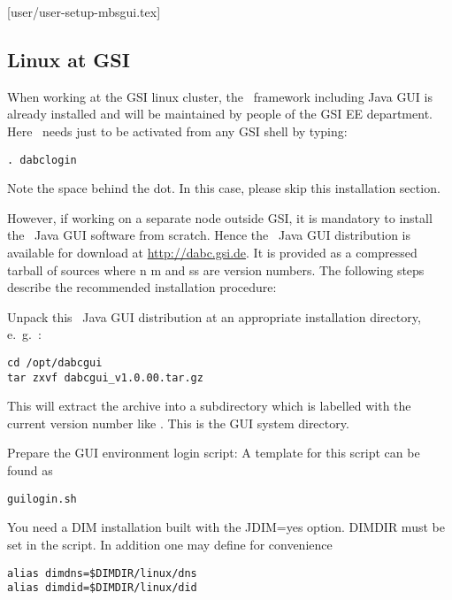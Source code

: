 [user/user-setup-mbsgui.tex]
\label{user-setup-mbsgui-chapter}

\subsection{Linux at GSI}
When working at the GSI linux cluster, the \dabc\ framework including Java GUI is already installed and will
be maintained by people of the GSI EE department. Here \dabc\ needs just to be
activated from any GSI shell by typing: 
\begin{small}
\begin{verbatim}
. dabclogin
\end{verbatim}
\end{small}
Note the space behind the dot.
In this case, please skip this installation section. 

However, if working on a separate node outside GSI, 
it is mandatory to install the \dabc\ Java GUI software
from scratch. 
Hence the \dabc\ Java GUI distribution is available for download at \hyperref{http://dabc.gsi.de}{}{}{http://dabc.gsi.de}.
It is provided as a compressed tarball of sources 
where n m and ss are version numbers.
The following steps describe the recommended installation procedure:

\bnum
\item Unpack this \dabc\ Java GUI distribution at an appropriate installation directory,
e.~g.~:
\begin{small}
\begin{verbatim}
cd /opt/dabcgui 
tar zxvf dabcgui_v1.0.00.tar.gz
\end{verbatim}
\end{small}
This will extract the archive into a subdirectory which is labelled
with the current version number like .
This is the GUI system directory.

\item Prepare the GUI environment login script:
A template for this script can be found as
\begin{small}
\begin{verbatim}
guilogin.sh
\end{verbatim}
\end{small}
You need a DIM installation built with the JDIM=yes option.
DIMDIR must be set in the script. In addition one may define for convenience
\begin{small}
\begin{verbatim}
alias dimdns=$DIMDIR/linux/dns
alias dimdid=$DIMDIR/linux/did
\end{verbatim}
\end{small}



